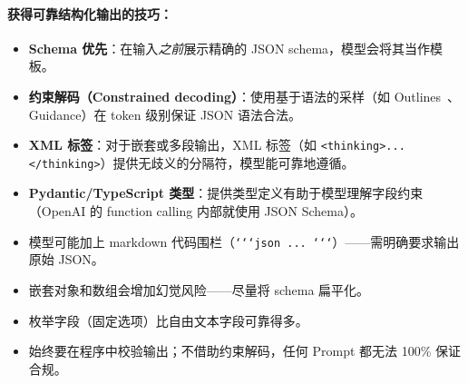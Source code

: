 \paragraph{获得可靠结构化输出的技巧：}
\label{techniques-for-reliable-structured-output}

\begin{itemize}
  \item \textbf{Schema 优先}：在输入\emph{之前}展示精确的 JSON schema，模型会将其当作模板。
  \item \textbf{约束解码（Constrained decoding）}：使用基于语法的采样（如 Outlines~\cite{willard2023outlines}、Guidance）在 token 级别保证 JSON 语法合法。
  \item \textbf{XML 标签}：对于嵌套或多段输出，XML 标签（如 \texttt{<thinking>...</thinking>}）提供无歧义的分隔符，模型能可靠地遵循。
  \item \textbf{Pydantic/TypeScript 类型}：提供类型定义有助于模型理解字段约束（OpenAI 的 function calling 内部就使用 JSON Schema）。
\end{itemize}

\begin{warningbox}
\begin{itemize}
  \item 模型可能加上 markdown 代码围栏（\texttt{‘‘‘json ... ‘‘‘}）——需明确要求输出原始 JSON。
  \item 嵌套对象和数组会增加幻觉风险——尽量将 schema 扁平化。
  \item 枚举字段（固定选项）比自由文本字段可靠得多。
  \item 始终要在程序中校验输出；不借助约束解码，任何 Prompt 都无法 100\% 保证合规。
\end{itemize}
\end{warningbox}

